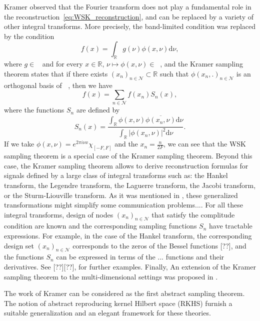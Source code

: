 \documentclass[twoside,11pt]{book}
\numberwithin{theorem}{chapter}
\numberwithin{definition}{chapter}
\numberwithin{proposition}{chapter}
\numberwithin{corollary}{chapter}
\numberwithin{example}{chapter}
\numberwithin{lemma}{chapter}
\numberwithin{assumption}{chapter}
\numberwithin{equation}{chapter}
\numberwithin{figure}{chapter}
\DeclareMathOperator{\LtwoR}{\mathbb{L}_{2}(\mathbb{R})}
\begin{document}
Kramer \cite{Kra59} observed that the Fourier transform does not play a fundamental role in the reconstruction~\eqref{eq:WSK_reconstruction}, and can be replaced by a variety of other integral transforms. More precisely, the band-limited condition was replaced by the condition 
\begin{equation}
f(x) = \int_{\mathbb{R}} g(\nu) \phi(x, \nu)  \mathrm{d}\nu,
\end{equation}
where $g \in \LtwoR$ and for every $x \in \mathbb{R}$, $\nu \mapsto \phi(x,\nu) \in \LtwoR$, and the Kramer sampling theorem states that if there exists $(x_{n})_{n \in \mathcal{N}} \subset \mathbb{R}$ such that $\phi(x_{n},.)_{n \in \mathcal{N}}$ is an orthogonal basis of $\LtwoR$, then we have
\begin{equation}\label{eq:Kramer_reconstruction}
f(x) = \sum\limits_{n \in \mathcal{N}} f(x_{n}) S_{n}(x),
\end{equation}
where the functions $S_{n}$ are defined by
\begin{equation}
S_{n}(x) = \frac{\int_{\mathbb{R}} \phi(x,\nu)  \overline{\phi(x_{n},\nu)} \mathrm{d} \nu  }{\int_{\mathbb{R}} |\phi(x_{n},\nu)|^{2} \mathrm{d}\nu}. 
\end{equation}
If we take $\phi(x,\nu) = e^{2\pi i \nu x} \chi_{[-F,F]}$ and the $x_{n} = \frac{n}{2F}$, we can see that the WSK sampling theorem is a special case of the Kramer sampling theorem. Beyond this case, the Kramer sampling theorem allows to derive reconstruction formulas for signals defined by a large class of integral transforms such as: the Hankel transform, the Legendre transform, the Laguerre transform, the Jacobi transform, or the Sturm-Liouville transform. As it was mentioned in \cite{Jer69}, these generalized transformations might simplify some communication problems.... For all these integral transforms, design of nodes $(x_{n})_{n \in \mathcal{N}}$ that satisfy the complitude condition are known and the corresponding sampling functions $S_{n}$ have tractable expressions. For example, in the case of the Hankel transform, the corresponding design set $(x_{n})_{n \in \mathcal{N}}$ corresponds to the zeros of the Bessel functions [??], and the functions $S_{n}$ can be expressed in terms of the ... functions and their derivatives. See [??][??], for further examples.
Finally, An extension of the Kramer sampling theorem to the multi-dimensional settings was proposed in \cite{Zay92}.


The work of Kramer can be considered as the first abstract sampling theorem.
The notion of abstract reproducing kernel Hilbert space (RKHS) furnish a suitable generalization and an elegant framework for these theories.
\end{document}
